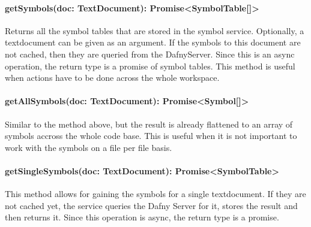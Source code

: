 \paragraph{getSymbols(doc: TextDocument): Promise<SymbolTable[]>} Returns all the symbol tables that are stored in the symbol service. Optionally, a textdocument can be given as an argument. If the symbols to this document are not cached, then they are queried from the DafnyServer. Since this is an async operation, the return type is a promise of symbol tables. This method is useful when actions have to be done across the whole workspace.

\paragraph{getAllSymbols(doc: TextDocument): Promise<Symbol[]>} Similar to the method above, but the result is already flattened to an array of symbols accross the whole code base. This is useful when it is not important to work with the symbols on a file per file basis.

\paragraph{getSingleSymbols(doc: TextDocument): Promise<SymbolTable>} This method allows for gaining the symbols for a single textdocument. If they are not cached yet, the service queries the Dafny Server for it, stores the result and then returns it. Since this operation is async, the return type is a promise.

